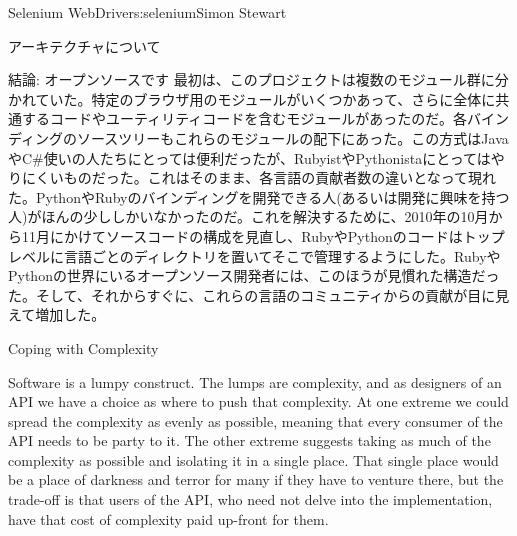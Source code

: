 \begin{aosachapter}{Selenium WebDriver}{s:selenium}{Simon Stewart}
\begin{aosasect1}{アーキテクチャについて}
\begin{aosasect2}{結論: オープンソースです}
最初は、このプロジェクトは複数のモジュール群に分かれていた。特定のブラウザ用のモジュールがいくつかあって、さらに全体に共通するコードやユーティリティコードを含むモジュールがあったのだ。各バインディングのソースツリーもこれらのモジュールの配下にあった。この方式はJavaやC\#使いの人たちにとっては便利だったが、RubyistやPythonistaにとってはやりにくいものだった。これはそのまま、各言語の貢献者数の違いとなって現れた。PythonやRubyのバインディングを開発できる人(あるいは開発に興味を持つ人)がほんの少ししかいなかったのだ。これを解決するために、2010年の10月から11月にかけてソースコードの構成を見直し、RubyやPythonのコードはトップレベルに言語ごとのディレクトリを置いてそこで管理するようにした。RubyやPythonの世界にいるオープンソース開発者には、このほうが見慣れた構造だった。そして、それからすぐに、これらの言語のコミュニティからの貢献が目に見えて増加した。

\end{aosasect2}

\end{aosasect1}

\begin{aosasect1}{Coping with Complexity}

Software is a lumpy construct. The lumps are complexity, and as
designers of an API we have a choice as where to push that
complexity. At one extreme we could spread the complexity as evenly as
possible, meaning that every consumer of the API needs to be party to
it. The other extreme suggests taking as much of the complexity as
possible and isolating it in a single place. That single place would
be a place of darkness and terror for many if they have to venture
there, but the trade-off is that users of the API, who need not delve
into the implementation, have that cost of complexity paid up-front
for them.


\end{aosasect1}
\end{aosachapter}
